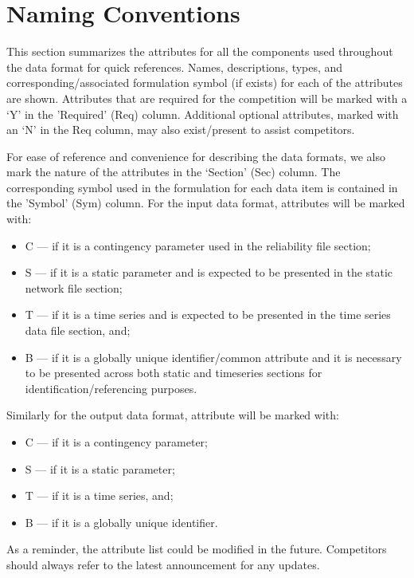 \documentclass{article}
\begin{document}
\section{Naming Conventions}
\label{sec:naming}
This section summarizes the attributes for all the components used throughout the data format for quick references.
Names, descriptions, types, and corresponding/associated formulation symbol (if exists) for each of the attributes are shown.
Attributes that are required for the competition
will be marked with a `Y' in the 'Required' (Req) column.
Additional optional attributes, marked with an `N' in the Req column, may also exist/present to assist competitors.

For ease of reference and convenience for describing the data formats, we also
mark the nature of the attributes in the `Section' (Sec) column. The corresponding symbol used in the formulation for each data item is contained in the 'Symbol' (Sym) column.
For the input data format, attributes will be marked with:
\begin{itemize}
\item C --- if it is a contingency parameter used in the reliability file section;
\item S --- if it is a static parameter and is expected to be presented in the static network file section;
\item T --- if it is a time series and is expected to be presented in the time series data file section, and;
\item B --- if it is a globally unique identifier/common attribute and it is necessary to be presented across both static and timeseries sections for identification/referencing purposes.  
\end{itemize}
Similarly for the output data format, attribute will be marked with:
\begin{itemize}
\item C --- if it is a contingency parameter;   
\item S --- if it is a static parameter;
\item T --- if it is a time series, and;
\item B --- if it is a globally unique identifier.
\end{itemize}
As a reminder, the attribute list could be modified in the future.
Competitors should always refer to the latest announcement for any
updates.
\end{document}
